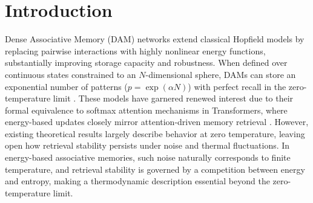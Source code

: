 \documentclass{article}
\theoremstyle{plain}
\theoremstyle{definition}
\theoremstyle{remark}
\begin{document}
\printAffiliationsAndNotice{}  %

\begin{abstract}
\textbf{We study the memory capacity of modern Hopfield networks (Dense Associative Memory models) for structured data, such as binary patterns and low-dimensional manifolds, extending classical analyses of unstructured patterns.}
We derive thermodynamic phase boundaries for Dense Associative Memory networks with exponential capacity $p = e^{\alpha N}$, comparing Gaussian (LSE) and Epanechnikov (LSR) kernels. For continuous neurons on an $N$-sphere, the geometric entropy depends solely on the spherical geometry, not the kernel. Sufficiently sharp kernels achieve maximum theoretical capacity $\alpha = 0.5$ at zero temperature; below this threshold, a critical line separates retrieval from a spin-glass phase. Kernel sharpness introduces a trade-off between energetic stability and entropic cost: while LSR provides deeper energy minima, it exhibits a smaller retrieval region than LSE at finite temperature because enforcing higher alignment incurs a geometric entropy penalty that outweighs the energetic gain. The kernels also differ qualitatively in their thermal limits: LSR possesses a finite maximum retrieval temperature, whereas LSE permits retrieval at arbitrarily high temperatures for sufficiently low loads
\textbf{These results advance the theory of high-capacity associative memory and inform the design of structured memory in modern attention-based architectures.}
\end{abstract}

\section{Introduction}

Dense Associative Memory (DAM) networks extend classical Hopfield models by replacing pairwise interactions with highly nonlinear energy functions, substantially improving storage capacity and robustness. When defined over continuous states constrained to an $N$-dimensional sphere, DAMs can store an exponential number of patterns ($p = \exp(\alpha N)$) with perfect recall in the zero-temperature limit \citep{demircigil2017model,ramsauer2021hopfield,lucibello2024exponential}. These models have garnered renewed interest due to their formal equivalence to softmax attention mechanisms in Transformers, where energy-based updates closely mirror attention-driven memory retrieval \citep{ramsauer2021hopfield}. However, existing theoretical results largely describe behavior at zero temperature, leaving open how retrieval stability persists under noise and thermal fluctuations. In energy-based associative memories, such noise naturally corresponds to finite temperature, and retrieval stability is governed by a competition between energy and entropy, making a thermodynamic description essential beyond the zero-temperature limit.
\end{document}
